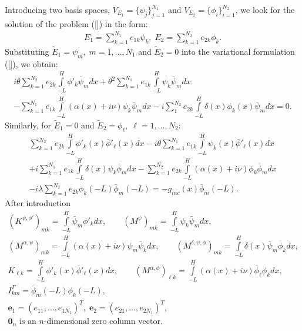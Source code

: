 Introducing two basis spaces, $V_{E_{1}}=\{\psi_{j}\}_{j=1}^{N_{1}}$ and $V_{E_{2}}=\{\phi_{i}\}_{i=1}^{N_{2}}$, we look for the solution of the problem (\ref{}) in the form:
\begin{align*}
E_{1}=\sum\limits_{k=1}^{N_{1}}e_{1k}\psi_{k},\; E_{2}=\sum\limits_{k=1}^{N_{2}}e_{2k}\phi_{k}.
\end{align*}
Substituting $\tilde{E}_{1}=\psi_{m}, \; m=1,\ldots,N_{1}$ and $\tilde{E}_{2}=0$ into the variational formulation (\ref{}), we obtain:
\begin{align*}
i\theta\sum\limits_{k=1}^{N_{2}}e_{2k}\int\limits_{-L}^{H}\phi'_{k}\bar{\psi}_{m}dx+\theta^2\sum\limits_{k=1}^{N_{1}}e_{1k}\int\limits_{-L}^{H}\psi_{k}\bar{\psi}_{m}dx\\
-\sum\limits_{k=1}^{N_{1}}e_{1k}\int\limits_{-L}^{H}(\alpha(x)+i\nu)\psi_{k}\bar{\psi}_{m}dx-i\sum\limits_{1}^{N_{2}}e_{2k}\int\limits_{-L}^{H}\delta(x)\phi_{k}(x)\bar{\psi}_{m}dx=0.
\end{align*}
Similarly, for $\tilde{E}_{1}=0$ and $\tilde{E}_{2}=\phi_{\ell},\; \ell=1,\ldots, N_{2}$:
\begin{align*}
\sum\limits_{k=1}^{N_{2}}e_{2k}\int\limits_{-L}^{H}\phi'_{k}(x)\bar{\phi}'_{\ell}(x)dx-i\theta\sum\limits_{k=1}^{N_{1}}e_{1k}\int\limits_{-L}^{H}\psi_{k}(x)\bar{\phi}'_{\ell}(x)dx\\
+i
\sum\limits_{k=1}^{N_{1}}e_{1k}\int\limits_{-L}^{H}\delta(x)\psi_{k}\bar{\phi}_{m}dx-\sum\limits_{k=1}^{N_{2}}e_{2k}\int\limits_{-L}^{H}(\alpha(x)+i\nu)\phi_{k}\bar{\phi}_{m}dx\\
-
i\lambda\sum\limits_{k=1}^{N_{2}}e_{2k}\phi_{k}(-L)\bar{\phi}_{m}(-L)=-g_{inc}(x)\bar{\phi}_{m}(-L).
\end{align*}
After introduction 
\begin{align*}
\left(K^{\psi,\phi'}\right)_{mk}=\int\limits_{-L}^{H}\bar{\psi}_{m}\phi'_{k}dx,\qquad \left(M^{\psi}\right)_{mk}=\int\limits_{-L}^{H}\psi_{k}\bar{\psi}_{m}dx,\\
\left(M^{\alpha,\psi}\right)_{mk}=\int\limits_{-L}^{H}(\alpha(x)+i\nu)\psi_{m}\bar{\psi}_{k}dx, \qquad \left(M^{\delta,\psi,\phi}\right)_{mk}=\int\limits_{-L}^{H}\delta(x)\bar{\psi}_{m}\phi_{k}dx,\\
K_{\ell k}=\int\limits_{-L}^{H}\phi'_{k}(x)\bar{\phi}'_{\ell}(x)dx,\qquad \left(M^{\alpha,\phi}\right)_{\ell k}=\int\limits_{-L}^{H}(\alpha(x)+i\nu)\bar{\phi}_{\ell}\phi_{k}dx,\\
I_{km}^{\Gamma}=\bar{\phi}_{m}(-L)\phi_{k}(-L),\\
\boldsymbol{e}_{1}=\left(e_{11},\ldots,e_{1 N_{1}}\right)^{T},\; \boldsymbol{e}_{2}=\left(e_{21},\ldots,e_{2 N_{1}}\right)^{T},\\
\boldsymbol{0}_{n} \text{ is an $n$-dimensional zero column vector}.
\end{align*}
